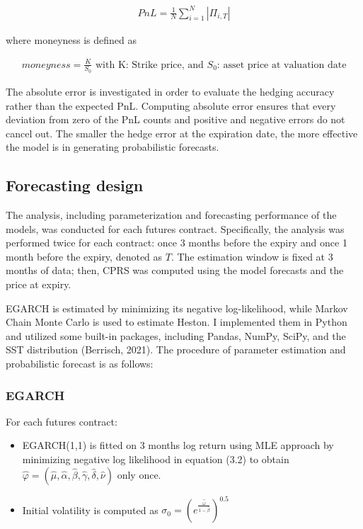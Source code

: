 \documentclass[12pt,a4paper]{article}
\numberwithin{equation}{section}
\begin{document}
\begin{align*}
PnL = \frac{1}{N} \sum_{i = 1}^{N} |\Pi_{i,T}|
\end{align*}

where moneyness is defined as 

\begin{align*}
moneyness = \frac{K}{S_0} \text{ with K: Strike price, and $S_0$: asset price at valuation date}
\end{align*}

The absolute error is investigated in order to evaluate the hedging accuracy rather than the expected PnL. Computing absolute error ensures that every deviation from zero of the PnL counts and positive and negative errors do not cancel out. The smaller the hedge error at the expiration date, the more effective the model is in generating probabilistic forecasts.


\subsection{Forecasting design}

The analysis, including parameterization and forecasting performance of the models, was conducted for each futures contract. Specifically, the analysis was performed twice for each contract: once 3 months before the expiry and once 1 month before the expiry, denoted as $T$. The estimation window is fixed at 3 months of data; then, CPRS was computed using the model forecasts and the price at expiry.

EGARCH is estimated by minimizing its negative log-likelihood, while Markov Chain Monte Carlo is used to estimate Heston. I implemented them in Python and utilized some built-in packages, including Pandas, NumPy, SciPy, and the SST distribution (Berrisch, 2021). The procedure of parameter estimation and probabilistic forecast is as follows:

\subsubsection{EGARCH}

For each futures contract:

\begin{itemize}
\item EGARCH(1,1) is fitted on 3 months log return using MLE approach by minimizing negative log likelihood in equation (3.2) to obtain $ \hat{\varphi} = (\hat{\mu}, \hat{\alpha}, \hat{\beta}, \hat{\gamma}, \hat{\delta}, \hat{\nu})$ only once.
\item Initial volatility is computed as $\sigma_0 = (e^{\frac{\hat{\omega}}{1-\hat{\beta}}})^{0.5}$
\end{itemize}
\end{document}

